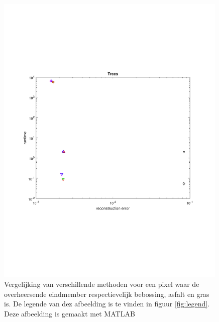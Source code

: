 \documentclass[12pt]{report}
\begin{document}
\begin{figure}
\includegraphics[width=0.99\textwidth,trim=0 200 0 175 cm]{plot_trees.pdf}
\caption{Vergelijking van verschillende methoden voor een pixel waar de overheersende eindmember respectievelijk bebossing, asfalt en gras is. De legende van dez afbeelding is te vinden in figuur \ref{fig:legend}. Deze afbeelding is gemaakt met MATLAB\cite{matlab}\label{fig:trees}}
\end{figure}
\end{document}
